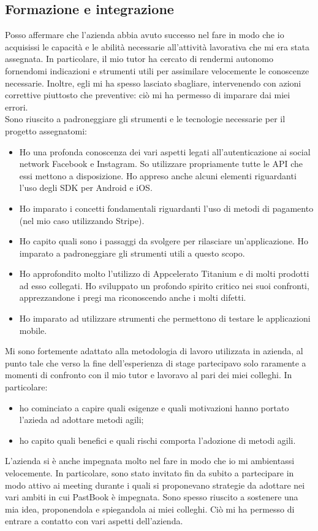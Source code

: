 		\subsection{Formazione e integrazione}
			Posso affermare che l'azienda abbia avuto successo nel fare in modo che io acquisissi le capacità e le abilità necessarie
			all'attività lavorativa che mi era stata assegnata. In particolare, il mio tutor ha cercato di rendermi autonomo fornendomi
			indicazioni e strumenti utili per assimilare velocemente le conoscenze necessarie. Inoltre, egli mi ha spesso lasciato
			sbagliare, intervenendo con azioni correttive piuttosto che preventive: ciò mi ha permesso di imparare dai miei errori.\\
			Sono riuscito a padroneggiare gli strumenti e le tecnologie necessarie per il progetto assegnatomi:
			\begin{itemize}
				\item Ho una profonda conoscenza dei vari aspetti legati all'autenticazione ai social network Facebook e Instagram.
				So utilizzare propriamente tutte le API che essi mettono a disposizione. Ho appreso anche alcuni elementi
				riguardanti l'uso degli SDK per Android e iOS.
				\item Ho imparato i concetti fondamentali riguardanti l'uso di metodi di pagamento (nel mio caso utilizzando Stripe).
				\item Ho capito quali sono i passaggi da svolgere per rilasciare un'applicazione. Ho imparato a padroneggiare gli
				strumenti utili a questo scopo.
				\item Ho approfondito molto l'utilizzo di Appcelerato Titanium e di molti prodotti ad esso collegati. Ho sviluppato
				un profondo spirito critico nei suoi confronti, apprezzandone i pregi ma riconoscendo anche i molti difetti.
				\item Ho imparato ad utilizzare strumenti che permettono di testare le applicazioni mobile.
			\end{itemize}
			Mi sono fortemente adattato alla metodologia di	lavoro utilizzata in azienda, al punto tale che verso la fine
			dell'esperienza di stage partecipavo solo raramente a momenti di confronto con il mio tutor e lavoravo al pari dei miei
			colleghi. In particolare:
			\begin{itemize}
				\item ho cominciato a capire quali esigenze e quali motivazioni hanno portato l'azieda ad adottare metodi agili;
				\item ho capito quali benefici e quali rischi comporta l'adozione di metodi agili.
			\end{itemize}
			L'azienda si è anche impegnata molto nel fare in modo che io mi ambientassi velocemente. In particolare, sono stato invitato
			fin da subito a partecipare in modo attivo ai meeting durante i quali si proponevano strategie da adottare nei vari ambiti
			in cui PastBook è impegnata. Sono spesso riuscito a sostenere una mia idea, proponendola e spiegandola ai miei colleghi. Ciò
			mi ha permesso di entrare a contatto con vari aspetti dell'azienda.
